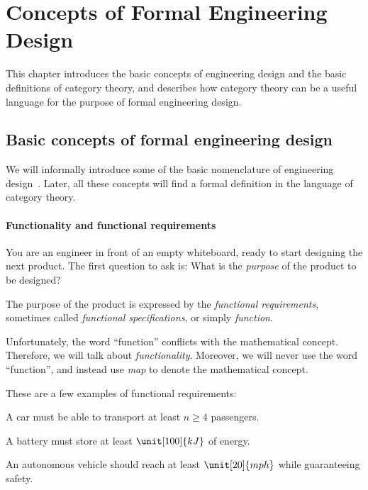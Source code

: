 \section{Concepts of  Formal Engineering Design}

This chapter introduces the basic concepts of engineering design and the basic definitions of
category theory, and describes how category theory can be a useful language for the purpose of
formal engineering design.

\subsection{Basic concepts of formal engineering design}

We will informally introduce some of the basic nomenclature of engineering
design~\cite{book-formal-engineering-design}. Later, all these concepts will find a formal
definition in the language of category theory.

\paragraph{Functionality and functional requirements}

You are an engineer in front of an empty whiteboard, ready to start designing the next product.
The first question to ask is: What is the \emph{purpose} of the product to be designed?

The purpose of the product is expressed by the \emph{functional requirements}, sometimes called
\emph{functional specifications}, or simply \emph{function}.

Unfortunately, the word ``function'' conflicts with the mathematical concept. Therefore, we
will talk  about \emph{functionality}. Moreover, we will never use the word ``function'', and
instead use \emph{map} to denote the mathematical concept.

\begin{example}
    These are a few examples of functional requirements:

    \begin{compactitem}
        \item A car must be able to transport at least $n \geq 4$ passengers.
        \item A battery must store at least $\unit[100]{kJ}$ of energy.
        \item An autonomous vehicle should reach at least $\unit[20]{mph}$ while guaranteeing safety.
    \end{compactitem}
\end{example}

